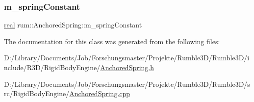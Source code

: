 \mbox{\label{classrum_1_1_anchored_spring_a9ceccbbc91b17c65825827b595d242d2}} 
\subsubsection{\texorpdfstring{m\+\_\+spring\+Constant}{m\_springConstant}}
{\footnotesize\ttfamily \mbox{\hyperlink{namespacerum_a7e8cca23573d5eaead0f138cbaa4862c}{real}} rum\+::\+Anchored\+Spring\+::m\+\_\+spring\+Constant\hspace{0.3cm}{\ttfamily [protected]}}



The documentation for this class was generated from the following files\+:\begin{DoxyCompactItemize}
\item 
D\+:/\+Library/\+Documents/\+Job/\+Forschungsmaster/\+Projekte/\+Rumble3\+D/\+Rumble3\+D/include/\+R3\+D/\+Rigid\+Body\+Engine/\mbox{\hyperlink{_anchored_spring_8h}{Anchored\+Spring.\+h}}\item 
D\+:/\+Library/\+Documents/\+Job/\+Forschungsmaster/\+Projekte/\+Rumble3\+D/\+Rumble3\+D/src/\+Rigid\+Body\+Engine/\mbox{\hyperlink{_anchored_spring_8cpp}{Anchored\+Spring.\+cpp}}\end{DoxyCompactItemize}
